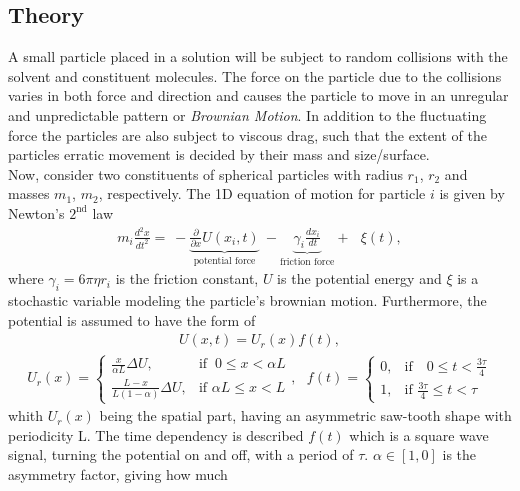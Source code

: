 \documentclass[11pt,a4paper]{article}
\begin{document}
\subsection{Theory}
A small particle placed in a solution will be subject to random collisions with the solvent and
constituent molecules. The force on the particle due to the collisions varies in both force and
direction and causes the particle to move in an unregular and unpredictable pattern
or \textit{Brownian Motion}. 
In addition to the fluctuating force the particles are also subject to viscous drag, such that the extent of the 
particles erratic movement is decided by their mass and size/surface. \\
Now, consider two constituents of spherical particles with radius $r_1$, $r_2$ and masses
$m_1$, $m_2$, respectively. The 1D equation of motion for particle $i$ is given by Newton's $2^{\text{nd}}$ law
\begin{align}
   m_i \frac{d^2x}{dt^2} = \: - \! \underbrace{\frac{\partial}{\partial x} U(x_i,t)}_{\text{potential force}} \:
                           - \!\!\!\! \underbrace{\gamma _i \frac{dx_i}{dt}}_{\text{friction force}} 
                            \! \! \! + \:\:\:  \xi (t),
\end{align}
where $\gamma_i = 6\pi \eta r_i$ is the friction constant, $U$ is the potential energy and $\xi$ is a stochastic variable modeling the particle's brownian motion. Furthermore, the potential is assumed to have the form of
\begin{align}
   U(x,t) = U_r(x) f(t),
\end{align}
%
\begin{align}
    U_r(x)= 
\begin{cases}
    \frac{x}{\alpha L} \Delta U, & \text{if } \: 0 \leq x < \alpha L\\
   \frac{L-x}{L(1-\alpha)} \Delta U, & \text{if } \alpha L \leq x < L
\end{cases}
\!
,
\:\:\:
f(t) =
\begin{cases}
    0, & \text{if } \:\:\: 0 \leq t < \frac{3\tau}{4}\\
   1, & \text{if } \frac{3\tau}{4} \leq t < \tau
\end{cases}
\end{align}
whith $U_r(x)$ being the spatial part, having an asymmetric saw-tooth shape with periodicity L.
The time dependency is described $f(t)$ which is a square wave signal, turning the potential
on and off, with a period of $\tau$. $\alpha\in [1,0]$ is the asymmetry factor, giving how much 
\end{document}
